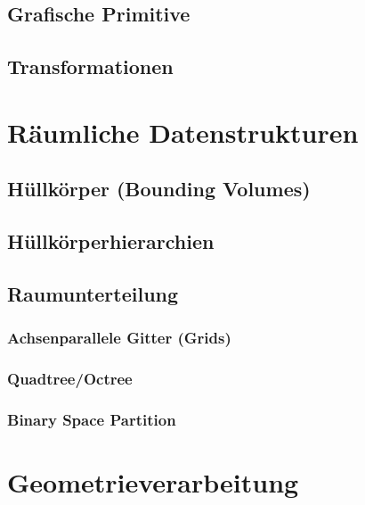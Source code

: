 \documentclass[a4paper, 11pt, accentcolor = tud3b]{tudreport}
\begin{document}
			\subsection{Grafische Primitive} %

			\subsection{Transformationen} %

		\section{Räumliche Datenstrukturen} %

			\subsection{Hüllkörper (Bounding Volumes)} %

			\subsection{Hüllkörperhierarchien} %

			\subsection{Raumunterteilung} %

				\subsubsection{Achsenparallele Gitter (Grids)} %

				\subsubsection{Quadtree/Octree} %

				\subsubsection{Binary Space Partition} %

		\section{Geometrieverarbeitung} %
\end{document}
